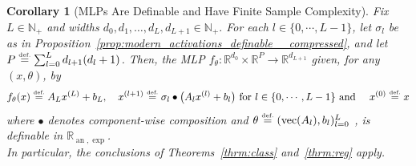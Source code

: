 \documentclass{article}
\newcommand{\eqdef}{\ensuremath{\stackrel{\mbox{\upshape\tiny def.}}{=}}}
\theoremstyle{plain}
\newtheorem{corollary}[theorem]{Corollary}
\theoremstyle{definition}
\theoremstyle{remark}
\theoremstyle{plain}
\numberwithin{thm}{section}
\theoremstyle{definition}
\numberwithin{equation}{section}
\begin{document}
\begin{corollary}[MLPs Are Definable and Have Finite Sample Complexity]
\label{cor:fixed_mlp_sample_complexity}
Fix $L\in\mathbb{N}_+$ and widths
$
    d_0,d_1,\dots,d_L,d_{L+1}\in\mathbb{N}_+ .
$
For each $l\in\{0,\cdots,L-1\}$, let $\sigma_l$ be as in Proposition~\ref{prop:modern_activations_definable__compressed}, and let $P\eqdef \sum_{l=0}^{L} d_{l+1}(d_l+1)$.  
Then, the MLP $f_{\theta}:\mathbb{R}^{d_0}\times \mathbb{R}^P\to \mathbb{R}^{d_{L+1}}$ given, for any $(x,\theta)$, by
\[
    f_{\theta}(x)
    \eqdef 
    A_L x^{(L)}+b_L,
    \quad
    x^{(l+1)}\eqdef \sigma_l\bullet
    \big(
        A_l x^{(l)}+b_l
    \big)
    \mbox{ for }l\in \{0,\cdots,L-1\}
    \mbox{ and }
    \quad
    x^{(0)}\eqdef x
\]
where $\bullet$ denotes component-wise composition
 and 
 $\theta \eqdef (\operatorname{vec}(A_l),b_l)_{l=0}^{L}$
, is definable in $\mathbb{R}_{\operatorname{an},\exp}$.
\hfill\\
In particular, the conclusions of Theorems~\ref{thrm:class} and~\ref{thrm:reg} apply.
\end{corollary}
\end{document}
